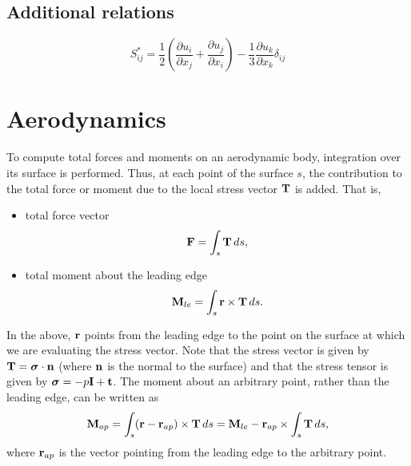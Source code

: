 \documentclass[oneside,a4paper,11pt]{report}
\begin{document}
\section{Additional relations}
\begin{equation}
    S^*_{ij} = \frac{1}{2} \left ( \frac{\partial u_i}{\partial x_j} + \frac{\partial u_j}{\partial x_i} \right ) - \frac{1}{3} \frac{\partial u_k}{\partial x_k} \delta_{ij}
\end{equation}

\chapter{Aerodynamics}
To compute total forces and moments on an aerodynamic body, integration over its surface is performed. Thus, at each point of the surface $s$, the contribution to the total force or moment due to the local stress vector $\mathbf{T}$ is added. That is,
\begin{itemize}
    \item total force vector
    \begin{equation}
        \mathbf{F} = \int_s \mathbf{T} \, ds,
    \end{equation}
    \item total moment about the leading edge 
    \begin{equation}
        \mathbf{M}_{le} = \int_s \mathbf{r} \times \mathbf{T} \, ds.
    \end{equation}
\end{itemize}
In the above, $\mathbf{r}$ points from the leading edge to the point on the surface at which we are evaluating the stress vector. Note that the stress vector is given by $\mathbf{T} = \boldsymbol{\sigma} \cdot \mathbf{n}$ (where $\mathbf{n}$ is the normal to the surface) and that the stress tensor is given by $\boldsymbol{\sigma} = -p \mathbf{I} + \mathbf{t}$. The moment about an arbitrary point, rather than the leading edge, can be written as
\begin{equation}
\label{eq:moment_shift}
    \mathbf{M}_{ap} = \int_s (\mathbf{r} - \mathbf{r}_{ap} ) \times \mathbf{T} \, ds = \mathbf{M}_{le} - \mathbf{r}_{ap} \times \int_s  \mathbf{T} \, ds,
\end{equation}
where $\mathbf{r}_{ap}$ is the vector pointing from the leading edge to the arbitrary point. 
\end{document}
